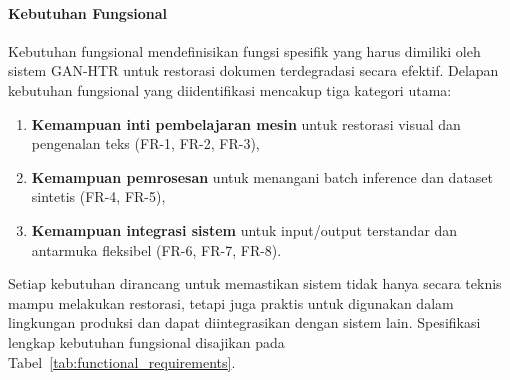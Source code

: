 \documentclass[12pt,a4paper]{book}
\begin{document}
\paragraph{Kebutuhan Fungsional}

Kebutuhan fungsional mendefinisikan fungsi spesifik yang harus dimiliki oleh sistem GAN-HTR untuk restorasi dokumen terdegradasi secara efektif. Delapan kebutuhan fungsional yang diidentifikasi mencakup tiga kategori utama:

\begin{enumerate}[nosep]
    \item \textbf{Kemampuan inti pembelajaran mesin} untuk restorasi visual dan pengenalan teks (FR-1, FR-2, FR-3),
    \item \textbf{Kemampuan pemrosesan} untuk menangani batch inference dan dataset sintetis (FR-4, FR-5),
    \item \textbf{Kemampuan integrasi sistem} untuk input/output terstandar dan antarmuka fleksibel (FR-6, FR-7, FR-8).
\end{enumerate}

Setiap kebutuhan dirancang untuk memastikan sistem tidak hanya secara teknis mampu melakukan restorasi, tetapi juga praktis untuk digunakan dalam lingkungan produksi dan dapat diintegrasikan dengan sistem lain. Spesifikasi lengkap kebutuhan fungsional disajikan pada Tabel~\ref{tab:functional_requirements}.
\end{document}
